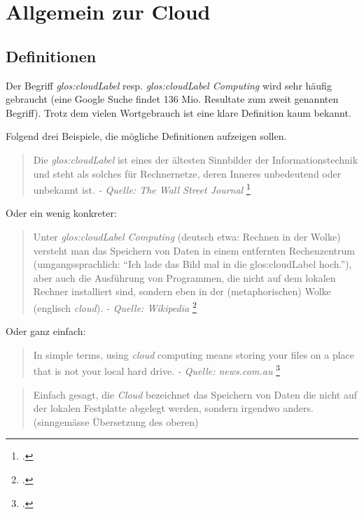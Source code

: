 \chapter{Allgemein zur Cloud}

\section{Definitionen}
\label{sec:cloud:definition}

Der Begriff \textit{\Gls{glos:cloudLabel}} resp. \textit{\Gls{glos:cloudLabel} Computing} wird sehr häufig gebraucht (eine Google Suche findet 136 Mio. Resultate zum zweit genannten Begriff).
Trotz dem vielen Wortgebrauch ist eine klare Definition kaum bekannt.

Folgend drei Beispiele, die mögliche Definitionen aufzeigen sollen.

\begin{quote}
	Die \textit{\Gls{glos:cloudLabel}} ist eines der ältesten Sinnbilder der Informationstechnik und steht als solches für Rechnernetze, deren Inneres unbedeutend oder unbekannt ist. \textit{- Quelle: The Wall Street Journal}  \footcite{The_Internet_Industry_Is_on_a_Cloud_--_Whatever_That_May_Mean_-_WSJ_2014-10-03}
\end{quote}

Oder ein wenig konkreter:

\begin{quote}
	Unter \textit{\Gls{glos:cloudLabel} Computing} (deutsch etwa: Rechnen in der Wolke) versteht man das Speichern von Daten in einem entfernten Rechenzentrum (umgangssprachlich: "`Ich lade das Bild mal in die \Gls{glos:cloudLabel} hoch."'), aber auch die Ausführung von Programmen, die nicht auf dem lokalen Rechner installiert sind, sondern eben in der (metaphorischen) Wolke (englisch \textit{cloud}). \textit{- Quelle: Wikipedia} \footcite{Cloud_Computing__Wikipedia_2014-10-03}
\end{quote}

Oder ganz einfach:

\begin{quote}
	In simple terms, using \textit{cloud} computing means storing your files on a place that is not your local hard drive.  \textit{- Quelle: news.com.au} \footcite{What_really_is_The_Cloud?_And_how_does_it_work?_A_simple_explainer_2014-10-31}
\end{quote}
\begin{quote}
	Einfach gesagt, die \textit{Cloud} bezeichnet das Speichern von Daten die nicht auf der lokalen Festplatte abgelegt werden, sondern irgendwo anders. (sinngemässe Übersetzung des oberen)
\end{quote}

